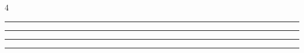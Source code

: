 \documentclass[a6paper]{article}
\begin{document}
\begin{center}
\begin{animateinline}{4}
\textcolor[rgb]{1,0,0}{\rule{3cm}{3cm}}
\newframe
\textcolor[rgb]{0,1,0}{\rule{3cm}{3cm}}
\newframe
\textcolor[rgb]{0,0,1}{\rule{3cm}{3cm}}
\newframe
\textcolor[rgb]{1,0.6,0}{\rule{3cm}{3cm}}
\end{animateinline}
\end{center}
\end{document}
